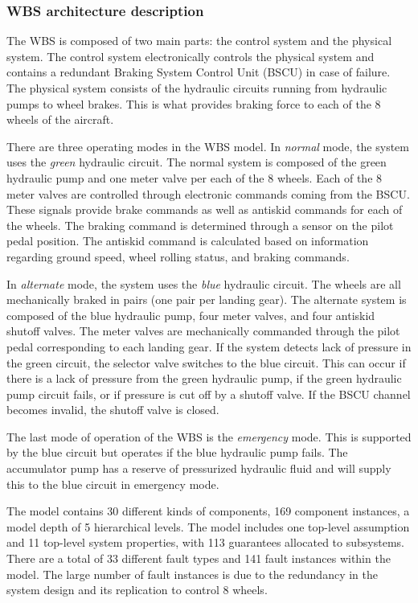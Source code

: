 \subsubsection{WBS architecture description}
The WBS is composed of two main parts: the control system and the physical system. The control system electronically controls the physical system and contains a redundant Braking System Control Unit (BSCU) in case of failure. The physical system consists of the hydraulic circuits running from hydraulic pumps to wheel brakes. This is what provides braking force to each of the 8 wheels of the aircraft.

There are three operating modes in the WBS model. In \textit{normal} mode, the system uses the \textit{green} hydraulic circuit. The normal system is composed of the green hydraulic pump and one meter valve per each of the 8 wheels. Each of the 8 meter valves are controlled through electronic commands coming from the BSCU. These signals provide brake commands as well as antiskid commands for each of the wheels. The braking command is determined through a sensor on the pilot pedal position. The antiskid command is calculated based on information regarding ground speed, wheel rolling status, and braking commands.

In \textit{alternate} mode, the system uses the \textit{blue} hydraulic circuit.  The wheels are all mechanically braked in pairs (one pair per landing gear). The alternate system is composed of the blue hydraulic pump, four meter valves, and four antiskid shutoff valves. The meter valves are mechanically commanded through the pilot pedal corresponding to each landing gear. If the system detects lack of pressure in the green circuit, the selector valve switches to the blue circuit. This can occur if there is a lack of pressure from the green hydraulic pump, if the green hydraulic pump circuit fails, or if pressure is cut off by a shutoff valve. If the BSCU channel becomes invalid, the shutoff valve is closed.

The last mode of operation of the WBS is the \textit{emergency} mode. This is supported by the blue circuit but operates if the blue hydraulic pump fails. The accumulator pump has a reserve of pressurized hydraulic fluid and will supply this to the blue circuit in emergency mode.

The model contains 30 different kinds of components, 169 component instances, a model depth of 5 hierarchical levels.  The model includes one top-level assumption and  11 top-level system properties, with 113 guarantees allocated to subsystems.  There are a total of 33 different fault types and 141 fault instances within the model.  The large number of fault instances is due to the redundancy in the system design and its replication to control 8 wheels. 


